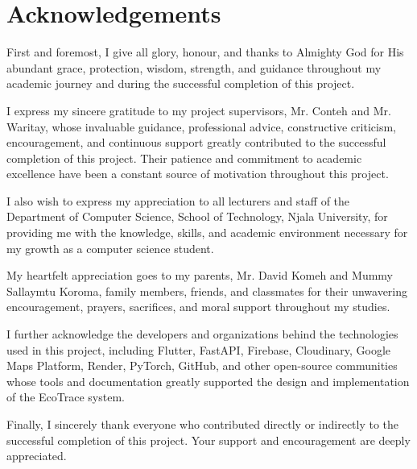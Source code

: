 \chapter*{Acknowledgements}

First and foremost, I give all glory, honour, and thanks to Almighty God for His
abundant grace, protection, wisdom, strength, and guidance throughout my academic
journey and during the successful completion of this project.

I express my sincere gratitude to my project supervisors, Mr. Conteh and Mr.
Waritay, whose invaluable guidance, professional advice, constructive criticism,
encouragement, and continuous support greatly contributed to the successful
completion of this project. Their patience and commitment to academic excellence
have been a constant source of motivation throughout this project.

I also wish to express my appreciation to all lecturers and staff of the Department
of Computer Science, School of Technology, Njala University, for providing me with
the knowledge, skills, and academic environment necessary for my growth as a
computer science student.

My heartfelt appreciation goes to my parents, Mr. David Komeh and Mummy
Sallaymtu Koroma, family members, friends, and classmates for their unwavering
encouragement, prayers, sacrifices, and moral support throughout my studies.

I further acknowledge the developers and organizations behind the technologies
used in this project, including Flutter, FastAPI, Firebase, Cloudinary, Google Maps
Platform, Render, PyTorch, GitHub, and other open-source communities whose tools
and documentation greatly supported the design and implementation of the EcoTrace
system.

Finally, I sincerely thank everyone who contributed directly or indirectly to the
successful completion of this project. Your support and encouragement are deeply
appreciated.
